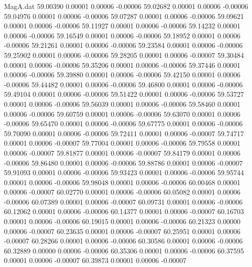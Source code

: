 \begin{filecontents}{MagA.dat}
  59.00390    0.00001    0.00006   -0.00006
  59.02682    0.00001    0.00006   -0.00006
  59.04976    0.00001    0.00006   -0.00006
  59.07287    0.00001    0.00006   -0.00006
  59.09621    0.00001    0.00006   -0.00006
  59.11927    0.00001    0.00006   -0.00006
  59.14232    0.00001    0.00006   -0.00006
  59.16549    0.00001    0.00006   -0.00006
  59.18952    0.00001    0.00006   -0.00006
  59.21261    0.00001    0.00006   -0.00006
  59.23584    0.00001    0.00006   -0.00006
  59.25902    0.00001    0.00006   -0.00006
  59.28205    0.00001    0.00006   -0.00007
  59.30484    0.00001    0.00006   -0.00006
  59.35206    0.00001    0.00006   -0.00006
  59.37446    0.00001    0.00006   -0.00006
  59.39880    0.00001    0.00006   -0.00006
  59.42150    0.00001    0.00006   -0.00006
  59.44482    0.00001    0.00006   -0.00006
  59.46800    0.00001    0.00006   -0.00006
  59.49104    0.00001    0.00006   -0.00006
  59.51422    0.00001    0.00006   -0.00006
  59.53727    0.00001    0.00006   -0.00006
  59.56039    0.00001    0.00006   -0.00006
  59.58460    0.00001    0.00006   -0.00006
  59.60759    0.00001    0.00006   -0.00006
  59.63070    0.00001    0.00006   -0.00006
  59.65470    0.00001    0.00006   -0.00006
  59.67775    0.00001    0.00006   -0.00006
  59.70090    0.00001    0.00006   -0.00006
  59.72411    0.00001    0.00006   -0.00007
  59.74717    0.00001    0.00006   -0.00007
  59.77004    0.00001    0.00006   -0.00006
  59.79558    0.00001    0.00006   -0.00007
  59.81877    0.00001    0.00006   -0.00007
  59.84179    0.00001    0.00006   -0.00006
  59.86480    0.00001    0.00006   -0.00006
  59.88786    0.00001    0.00006   -0.00007
  59.91093    0.00001    0.00006   -0.00006
  59.93423    0.00001    0.00006   -0.00006
  59.95744    0.00001    0.00006   -0.00006
  59.98048    0.00001    0.00006   -0.00006
  60.00468    0.00001    0.00006   -0.00007
  60.02770    0.00001    0.00006   -0.00006
  60.05082    0.00001    0.00006   -0.00006
  60.07389    0.00001    0.00006   -0.00007
  60.09731    0.00001    0.00006   -0.00006
  60.12062    0.00001    0.00006   -0.00006
  60.14377    0.00001    0.00006   -0.00007
  60.16703    0.00001    0.00006   -0.00006
  60.19015    0.00001    0.00006   -0.00006
  60.21323    0.00000    0.00006   -0.00007
  60.23635    0.00001    0.00006   -0.00007
  60.25951    0.00001    0.00006   -0.00007
  60.28266    0.00001    0.00006   -0.00006
  60.30586    0.00001    0.00006   -0.00006
  60.32889    0.00000    0.00006   -0.00006
  60.35306    0.00001    0.00006   -0.00006
  60.37595    0.00001    0.00006   -0.00007
  60.39873    0.00001    0.00006   -0.00007

\end{filecontents}
